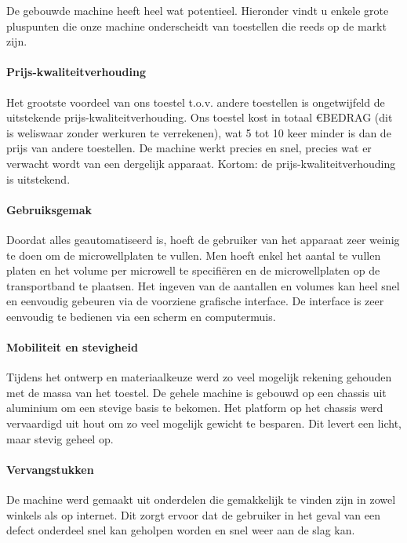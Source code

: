 \documentclass[a4paper,twoside,kulak]{kulakreport} %
\begin{document}
De gebouwde machine heeft heel wat potentieel. Hieronder vindt u enkele grote pluspunten die onze machine onderscheidt van toestellen die reeds op de markt zijn.

\paragraph{Prijs-kwaliteitverhouding}

Het grootste voordeel van ons toestel t.o.v. andere toestellen is ongetwijfeld de uitstekende prijs-kwaliteitverhouding. Ons toestel kost in totaal \euro BEDRAG (dit is weliswaar zonder werkuren te verrekenen), wat 5 tot 10 keer minder is dan de prijs van andere toestellen. De machine werkt precies en snel, precies wat er verwacht wordt van een dergelijk apparaat. Kortom: de prijs-kwaliteitverhouding is uitstekend.

\paragraph{Gebruiksgemak}

Doordat alles geautomatiseerd is, hoeft de gebruiker van het apparaat zeer weinig te doen om de microwellplaten te vullen. Men hoeft enkel het aantal te vullen platen en het volume per microwell te specifiëren en de microwellplaten op de transportband te plaatsen. Het ingeven van de aantallen en volumes kan heel snel en eenvoudig gebeuren via de voorziene grafische interface. De interface is zeer eenvoudig te bedienen via een scherm en computermuis.

\paragraph{Mobiliteit en stevigheid}

Tijdens het ontwerp en materiaalkeuze werd zo veel mogelijk rekening gehouden met de massa van het toestel. De gehele machine is gebouwd op een chassis uit aluminium om een stevige basis te bekomen. Het platform op het chassis werd vervaardigd uit hout om zo veel mogelijk gewicht te besparen. Dit levert een licht, maar stevig geheel op. 

\paragraph{Vervangstukken}

De machine werd gemaakt uit onderdelen die gemakkelijk te vinden zijn in zowel winkels als op internet. Dit zorgt ervoor dat de gebruiker in het geval van een defect onderdeel snel kan geholpen worden en snel weer aan de slag kan.
\end{document}
